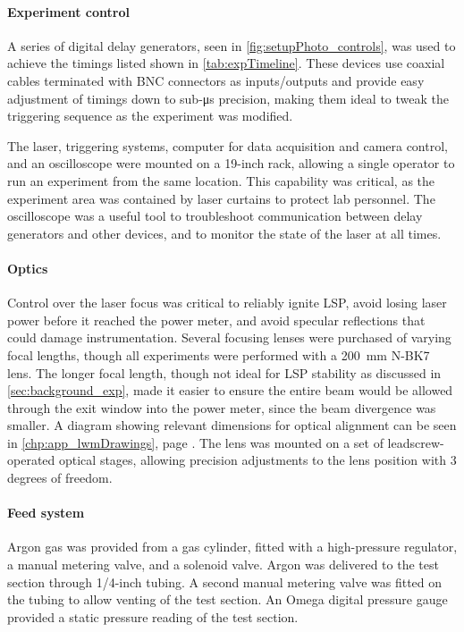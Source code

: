                 \paragraph{Experiment control} A series of digital delay generators, seen in \autoref{fig:setupPhoto_controls}, was used to achieve the timings listed shown in \autoref{tab:expTimeline}. These devices use coaxial cables terminated with BNC connectors as inputs/outputs and provide easy adjustment of timings down to sub-\unit{\us} precision, making them ideal to tweak the triggering sequence as the experiment was modified.

                The laser, triggering systems, computer for data acquisition and camera control, and an oscilloscope were mounted on a 19-inch rack, allowing a single operator to run an experiment from the same location. This capability was critical, as the experiment area was contained by laser curtains to protect lab personnel. The oscilloscope was a useful tool to troubleshoot communication between delay generators and other devices, and to monitor the state of the laser at all times.

                \paragraph{Optics} Control over the laser focus was critical to reliably ignite LSP, avoid losing laser power before it reached the power meter, and avoid specular reflections that could damage instrumentation. Several focusing lenses were purchased of varying focal lengths, though all experiments were performed with a \qty{200}{mm} N-BK7 lens. The longer focal length, though not ideal for LSP stability as discussed in \autoref{sec:background_exp}, made it easier to ensure the entire beam would be allowed through the exit window into the power meter, since the beam divergence was smaller. A diagram showing relevant dimensions for optical alignment can be seen in \autoref{chp:app_lwmDrawings}, page \pageref*{chp:app_optics}. The lens was mounted on a set of leadscrew-operated optical stages, allowing precision adjustments to the lens position with 3 degrees of freedom.

                \paragraph{Feed system} Argon gas was provided from a gas cylinder, fitted with a high-pressure regulator, a manual metering valve, and a solenoid valve. Argon was delivered to the test section through 1/4-inch tubing. A second manual metering valve was fitted on the tubing to allow venting of the test section. An Omega digital pressure gauge provided a static pressure reading of the test section.

